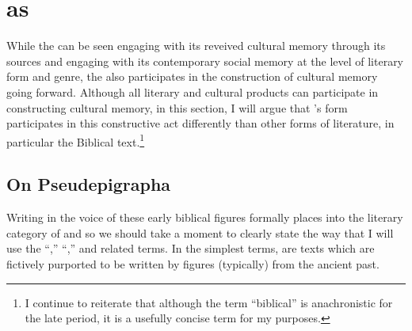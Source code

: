 
\section{\ga as \psa}

While the \ga can be seen engaging with its reveived cultural memory through its sources and engaging with its contemporary social memory at the level of literary form and genre, the \ga also participates in the construction of cultural memory going forward. Although all literary and cultural products can participate in constructing cultural memory, in this section, I will argue that \ga's \psgraphic form participates in this constructive act differently than other forms of literature, in particular the Biblical text.\footnote{I continue to reiterate that although the term ``biblical'' is anachronistic for the late \secondtemple period, it is a usefully concise term for my purposes.}

\subsection{On Pseudepigrapha}

Writing in the voice of these early biblical figures formally places \ga into the literary category of \psy and so we should take a moment to clearly state the way that I will use the ``\psy,'' ``\psa,'' and related terms.\autocites[The topic of \psy has received a large amount of very sophisticated attention in recent years. See especially][]{mroczek2016}{tigchelaar_tigchelaar2014}{reed_towsend-moulie2011}{reed_jts2009}{reed_ditomasso-turcescu2008}{najman_hilhorst-puech2007}{najman2003} In the simplest terms, \psa are texts which are fictively purported to be written by figures (typically) from the ancient past. 


